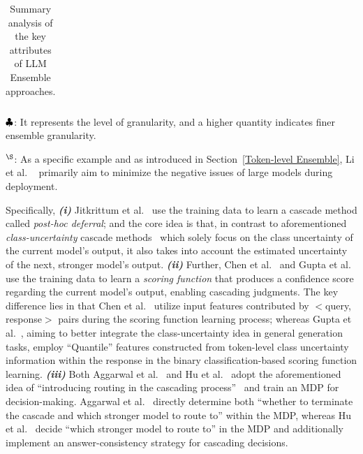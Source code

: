 \documentclass{article}
\begin{document}
\begin{table}[t!]
{\begin{threeparttable}
{\begin{tabular}{llcc    c}
\bottomrule
\end{tabular}
}
\begin{tablenotes}
\small
\item[1] \({\tiny\clubsuit}\): It represents the level of granularity, and a higher quantity indicates finer ensemble granularity.
\item[2] $^{\S}$: As a specific example and as introduced in Section~\ref{Token-level Ensemble}, Li et al. ~ primarily aim to minimize the negative issues of large models during deployment.
\end{tablenotes}
\end{threeparttable} 
}
\smallskip
\hfil
\captionsetup{type=table,skip=5pt}
  \caption{Summary analysis of the key attributes of LLM Ensemble approaches.}
    \label{summary-final}
\end{table}





Specifically, \textbf{\textit{(i)}} Jitkrittum et al.~ use the training data to learn a cascade method called \textit{post-hoc deferral}; and the core idea is that, in contrast to aforementioned \textit{class-uncertainty}
cascade methods~\cite{varshney2022model,ramirez2023cache,dekoninck2024unified} which solely focus on the class uncertainty of the current model’s output, it also takes into account the estimated uncertainty of the next, stronger model’s output.
\textbf{\textit{(ii)}} Further, Chen et al.~ and Gupta et al.~ use the training data to learn a \textit{scoring function} that produces a confidence score regarding the current model’s output, enabling cascading judgments.
The key difference lies in that Chen et al.~ utilize input features contributed by $<$query, response$>$ pairs during the scoring function learning process; whereas Gupta et al.~, aiming to better integrate the class-uncertainty idea in general generation tasks, employ ``Quantile'' features constructed from token-level class uncertainty information within the response in the binary classification-based scoring function learning.
\textbf{\textit{(iii)}} 
Both Aggarwal et al.~ and Hu et al.~ adopt the aforementioned idea of ``introducing routing in the cascading process''~\cite{dekoninck2024unified} and train an MDP for decision-making.
Aggarwal et al.~ directly determine both ``whether to terminate the cascade and which stronger model to route to'' within the MDP, whereas  Hu et al.~  decide ``which stronger model to route to'' in the MDP and additionally implement an answer-consistency strategy for cascading decisions.
\end{document}
